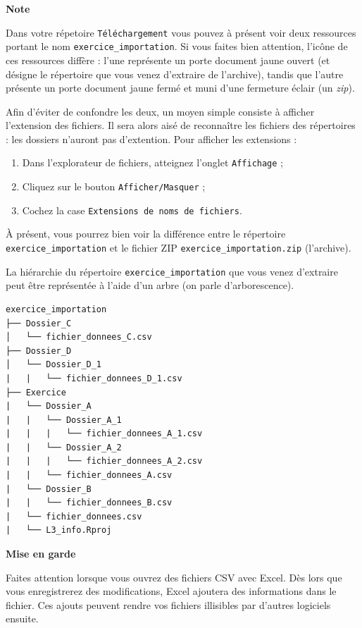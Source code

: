 \documentclass[
  11pt,
]{book}
\providecommand{\tightlist}{%
  \setlength{\itemsep}{0pt}\setlength{\parskip}{0pt}}
\numberwithin{equation}{section}
\numberwithin{countremarque}{section}
\newenvironment{notebox}{
  \begin{tcolorbox}[breakable, colback=jaune,coltext=black,
                  colframe=grisfonce]}
 {\end{tcolorbox}}
\newenvironment{redbox}{
  \begin{tcolorbox}[breakable, colback=rouge,coltext=white,
                  colframe=grisfonce]}
 {\end{tcolorbox}}
\begin{document}
\begin{notebox}
\textbf{Note}

Dans votre répetoire \texttt{Téléchargement} vous pouvez à présent voir deux ressources portant le nom \texttt{exercice\_importation}. Si vous faites bien attention, l'icône de ces ressources diffère : l'une représente un porte document jaune ouvert (et désigne le répertoire que vous venez d'extraire de l'archive), tandis que l'autre présente un porte document jaune fermé et muni d'une fermeture éclair (un \emph{zip}).

Afin d'éviter de confondre les deux, un moyen simple consiste à afficher l'extension des fichiers. Il sera alors aisé de reconnaître les fichiers des répertoires : les dossiers n'auront pas d'extention. Pour afficher les extensions :

\begin{enumerate}
\def\labelenumi{\arabic{enumi}.}
\tightlist
\item
  Dans l'explorateur de fichiers, atteignez l'onglet \texttt{Affichage} ;
\item
  Cliquez sur le bouton \texttt{Afficher/Masquer} ;
\item
  Cochez la case \texttt{Extensions\ de\ noms\ de\ fichiers}.
\end{enumerate}

À présent, vous pourrez bien voir la différence entre le répertoire \texttt{exercice\_importation} et le fichier ZIP \texttt{exercice\_importation.zip} (l'archive).

\end{notebox}

La hiérarchie du répertoire \texttt{exercice\_importation} que vous venez d'extraire peut être représentée à l'aide d'un arbre (on parle d'arborescence).

\begin{lstlisting}
exercice_importation
├── Dossier_C
│   └── fichier_donnees_C.csv
├── Dossier_D
│   └── Dossier_D_1
|   |   └── fichier_donnees_D_1.csv
├── Exercice
|   └── Dossier_A
|   |   └── Dossier_A_1
|   |   |   └── fichier_donnees_A_1.csv
|   |   └── Dossier_A_2
|   |   |   └── fichier_donnees_A_2.csv
|   |   └── fichier_donnees_A.csv
|   └── Dossier_B
|   |   └── fichier_donnees_B.csv
|   └── fichier_donnees.csv
|   └── L3_info.Rproj
\end{lstlisting}

\begin{redbox}
\textbf{Mise en garde}

Faites attention lorsque vous ouvrez des fichiers CSV avec Excel. Dès lors que vous enregistrerez des modifications, Excel ajoutera des informations dans le fichier. Ces ajouts peuvent rendre vos fichiers illisibles par d'autres logiciels ensuite.

\end{redbox}
\end{document}
